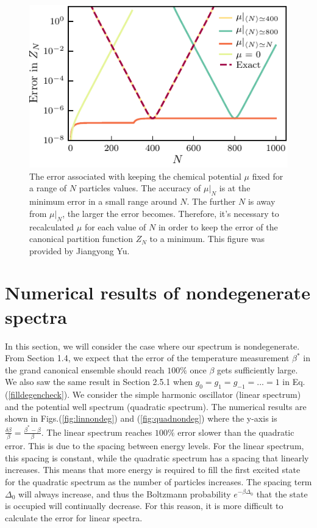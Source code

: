 \begin{figure}[H]
    \centering
    \includegraphics[scale=1.4]{figures/pdf/Plot1.pdf}
    \caption{The error associated with keeping the chemical potential $\mu$ fixed for a range of $N$ particles values. The accuracy of $\mu|_N$ is at the minimum error in a small range around $N$. The further $N$ is away from $\mu|_N$, the larger the error becomes. Therefore, it's necessary to recalculated $\mu$ for each value of $N$ in order to keep the error of the canonical partition function $Z_N$ to a minimum. This figure was provided by Jiangyong Yu. }
    \label{fig:Errors}
\end{figure}

\section{Numerical results of nondegenerate spectra}
In this section, we will consider the case where our spectrum is nondegenerate. From Section 1.4, we expect that the error of the temperature measurement $\beta^*$ in the grand canonical ensemble should reach $100\%$ once $\beta$ gets sufficiently large. We also saw the same result in Section 2.5.1 when $g_0=g_1=g_{-1}=...=1$ in Eq.\@ (\ref{filldegencheck}). We consider the simple harmonic oscillator (linear spectrum) and the potential well spectrum (quadratic spectrum). The numerical results are shown in Figs.\@ (\ref{fig:linnondeg}) and (\ref{fig:quadnondeg}) where the y-axis is $\frac{\delta\beta}{\beta}=\frac{\beta^*-\beta}{\beta}$. %
The linear spectrum reaches $100\%$ error slower than the quadratic error. This is due to the spacing between energy levels. For the linear spectrum, this spacing is constant, while the quadratic spectrum has a spacing that linearly increases. This means that more energy is required to fill the first excited state for the quadratic spectrum as the number of particles increases. The spacing term $\Delta_0$ will always increase, and thus the Boltzmann probability $e^{-\beta\Delta_0}$ that the state is occupied will continually decrease. For this reason, it is more difficult to calculate the error for linear spectra. 

